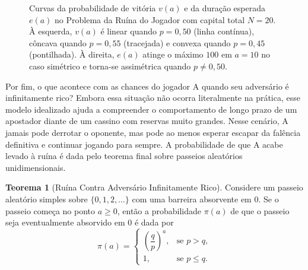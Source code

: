\documentclass[12pt,portuguese]{article}
\theoremstyle{definition}
\newtheorem{theorem}{Teorema}
\theoremstyle{plainexercise}
\theoremstyle{starredexercise}
\theoremstyle{definition}
\begin{document}
\begin{figure}[htbp]
  \caption{Curvas da probabilidade de vitória $v(a)$ e da duração esperada
    $e(a)$ no Problema da Ruína do Jogador com capital total $N = 20$. À
    esquerda, $v(a)$ é linear quando $p = 0{,}50$ (linha contínua), côncava
    quando $p = 0{,}55$ (tracejada) e convexa quando $p = 0{,}45$ (pontilhada).
    À direita, $e(a)$ atinge o máximo $100$ em $a = 10$ no caso simétrico e
    torna-se assimétrica quando $p \neq 0{,}50$.}
  \label{fig:curvas-ruina}
\end{figure}

Por fim, o que acontece com as chances do jogador A quando seu adversário é
infinitamente rico? Embora essa situação não ocorra literalmente na prática,
esse modelo idealizado ajuda a compreender o comportamento de longo prazo de um
apostador diante de um cassino com reservas muito grandes. Nesse cenário, A
jamais pode derrotar o oponente, mas pode ao menos esperar escapar da falência
definitiva e continuar jogando para sempre. A probabilidade de que A acabe
levado à ruína é dada pelo teorema final sobre passeios aleatórios
unidimensionais.

\begin{theorem}[Ruína Contra Adversário Infinitamente Rico]\label{thm:ruina-infinito}
  Considere um passeio aleatório simples sobre $\{0, 1, 2, \ldots\}$ com uma
  barreira absorvente em $0$. Se o passeio começa no ponto $a \geqslant 0$,
  então a probabilidade $\pi(a)$ de que o passeio seja eventualmente absorvido
  em $0$ é dada por
  \begin{equation}\label{eq:ruina-pi}
    \pi(a) =
    \begin{cases}
      \left(\dfrac{q}{p}\right)^a, & \text{se } p > q, \\[0.3cm]
      1, & \text{se } p \leqslant q.
    \end{cases}
  \end{equation}
\end{theorem}
\end{document}
